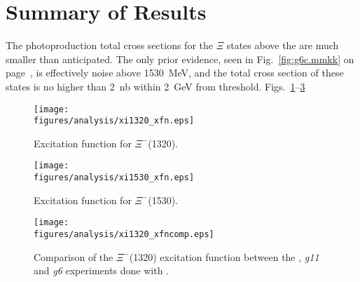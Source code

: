 \section{\label{sec:results.summary}Summary of Results}

The photoproduction total cross sections for the $\Xi$ states above the are much smaller than anticipated. The only prior evidence, seen in Fig.~\ref{fig:g6c.mmkk} on page~\pageref{fig:g6c.mmkk}, is effectively noise above 1530~MeV, and the total cross section of these states is no higher than 2~nb within 2~GeV from threshold. Figs.~\ref{fig:xim1320.xfn.all}--\ref{fig:xim1320.xfn.comp}

\begin{figure}[bh]\begin{center}
    \texttt{[image: \\figures/analysis/xi1320\_xfn.eps]}
    \caption[$\Xi^-$(1320) Total Cross Section]{\label{fig:xim1320.xfn.all}Excitation function for $\Xi^-$(1320).}
\end{center}\end{figure}

\begin{figure}[bh]\begin{center}
    \texttt{[image: \\figures/analysis/xi1530\_xfn.eps]}
    \caption[$\Xi^-$(1530) Total Cross Section]{\label{fig:analysis.xim1530.xfn.all}Excitation function for $\Xi^-$(1530).}
\end{center}\end{figure}

\begin{figure}[bh]\begin{center}
    \texttt{[image: \\figures/analysis/xi1320\_xfncomp.eps]}
    \caption[$\Xi^-$(1320) Total Cross Section Comparison]{\label{fig:xim1320.xfn.comp}Comparison of the $\Xi^-$(1320) excitation function between the , \emph{g11} and \emph{g6} experiments done with .}
\end{center}\end{figure}


\clearpage
